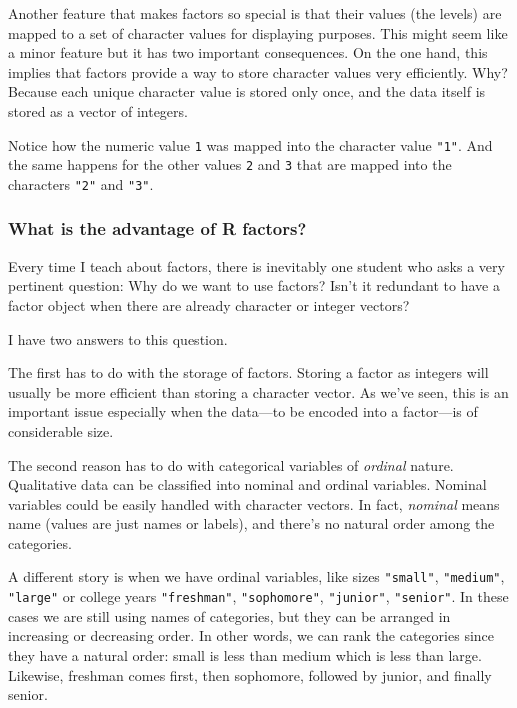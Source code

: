 \documentclass[
]{book}
\begin{document}
Another feature that makes factors so special is that their values (the levels)
are mapped to a set of character values for displaying purposes. This might
seem like a minor feature but it has two important consequences. On the one
hand, this implies that factors provide a way to store character values very
efficiently. Why? Because each unique character value is stored only once, and
the data itself is stored as a vector of integers.

Notice how the numeric value \texttt{1} was mapped into the character value \texttt{"1"}. And
the same happens for the other values \texttt{2} and \texttt{3} that are mapped into the
characters \texttt{"2"} and \texttt{"3"}.

\hypertarget{what-is-the-advantage-of-r-factors}{%
\subsubsection*{What is the advantage of R factors?}\label{what-is-the-advantage-of-r-factors}}

Every time I teach about factors, there is inevitably one student who asks a
very pertinent question: Why do we want to use factors? Isn't it redundant to
have a factor object when there are already character or integer vectors?

I have two answers to this question.

The first has to do with the storage of factors. Storing a factor as integers
will usually be more efficient than storing a character vector. As we've seen,
this is an important issue especially when the data---to be encoded into a
factor---is of considerable size.

The second reason has to do with categorical variables of \emph{ordinal} nature.
Qualitative data can be classified into nominal and ordinal variables. Nominal
variables could be easily handled with character vectors. In fact, \emph{nominal}
means name (values are just names or labels), and there's no natural order
among the categories.

A different story is when we have ordinal variables, like sizes \texttt{"small"},
\texttt{"medium"}, \texttt{"large"} or college years \texttt{"freshman"}, \texttt{"sophomore"}, \texttt{"junior"},
\texttt{"senior"}. In these cases we are still using names of categories, but they
can be arranged in increasing or decreasing order. In other words, we can rank
the categories since they have a natural order: small is less than medium which
is less than large. Likewise, freshman comes first, then sophomore, followed by
junior, and finally senior.
\end{document}
